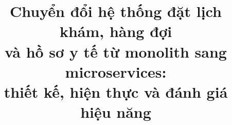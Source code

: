 \documentclass[conference,a4paper,10pt]{IEEEtran}
\begin{document}
\title{Chuyển đổi hệ thống đặt lịch khám, hàng đợi\\và hồ sơ y tế từ monolith sang microservices:\\thiết kế, hiện thực và đánh giá hiệu năng}

\author{
  \IEEEauthorblockN{\rule{4cm}{0.4pt}}
  \and
}

\maketitle
\thispagestyle{plain}
\pagestyle{plain}












\end{document}
